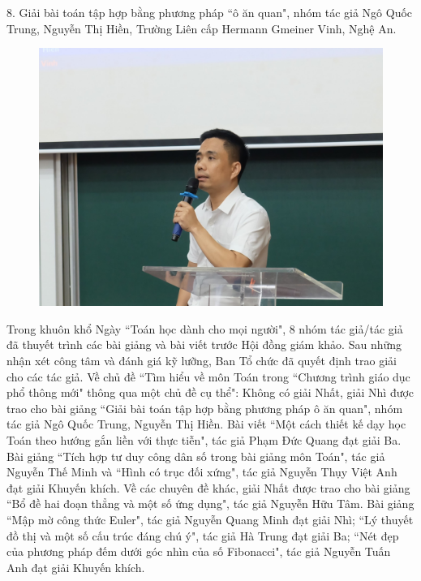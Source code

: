 \begin{multicols}{2}
\begin{figure}[H]
		\vspace*{-15pt}
	\end{figure}
	$8$. Giải bài toán tập hợp bằng phương pháp ``ô ăn quan", nhóm tác giả Ngô Quốc Trung, Nguyễn Thị Hiền, Trường Liên cấp Hermann Gmeiner Vinh, Nghệ An. 
	\begin{figure}[H]
		\vspace*{-5pt}
		\centering
		\captionsetup{labelformat= empty, justification=centering}
		\includegraphics[width= 1\linewidth]{9}
		\vspace*{-15pt}
	\end{figure}
	Trong khuôn khổ Ngày ``Toán học dành cho mọi người", $8$ nhóm tác giả/tác giả đã thuyết trình các bài giảng và bài viết trước Hội đồng giám khảo. Sau những nhận xét công tâm và đánh giá kỹ lưỡng, Ban Tổ chức đã quyết định trao giải cho các tác giả.
	\vskip 0.1cm
	Về chủ đề ``Tìm hiểu về môn Toán trong ``Chương trình giáo dục phổ thông mới" thông qua một chủ đề cụ thể": Không có giải Nhất, giải Nhì được trao cho bài giảng ``Giải bài toán tập hợp bằng phương pháp ô ăn quan", nhóm tác giả Ngô Quốc Trung, Nguyễn Thị Hiền. Bài viết ``Một cách thiết kế dạy học Toán theo hướng gắn liền với thực tiễn", tác giả Phạm Đức Quang đạt giải Ba. Bài giảng ``Tích hợp tư duy công dân số trong bài giảng môn Toán", tác giả Nguyễn Thế Minh và ``Hình có trục đối xứng", tác giả Nguyễn Thụy Việt Anh đạt giải Khuyến khích. 
	\vskip 0.1cm
	Về các chuyên đề khác, giải Nhất được trao cho bài giảng ``Bổ đề hai đoạn thẳng và một số ứng dụng", tác giả Nguyễn Hữu Tâm. Bài giảng ``Mập mờ công thức Euler", tác giả Nguyễn Quang Minh đạt giải Nhì; ``Lý thuyết đồ thị và một số cấu trúc đáng chú ý", tác giả Hà Trung đạt giải Ba; ``Nét đẹp của phương pháp đếm dưới góc nhìn của số Fibonacci", tác giả Nguyễn Tuấn Anh đạt giải Khuyến khích. 
	\end{multicols}
